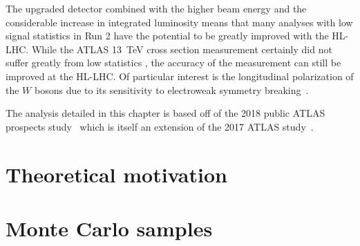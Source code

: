 The upgraded detector combined with the higher beam energy and the considerable increase in integrated luminosity means that many analyses with low signal statistics in Run 2 have the potential to be greatly improved with the HL-LHC.
While the ATLAS 13~TeV \ssww cross section measurement certainly did not suffer greatly from low statistics , the accuracy of the measurement can still be improved at the HL-LHC. %
Of particular interest is the longitudinal polarization of the $W$ bosons due to its sensitivity to electroweak symmetry breaking~\cite{2013.longitudinal-theory}.%

The analysis detailed in this chapter is based off of the 2018 public ATLAS \ssww prospects study~\cite{2018.ssww-upgrade} which is itself an extension of the 2017 ATLAS study~\cite{2017.ssww-upgrade}.  




%

\section{Theoretical motivation}\label{sswwupgrade:theory}


\section{Monte Carlo samples}\label{sswwupgrade:mc}


%

